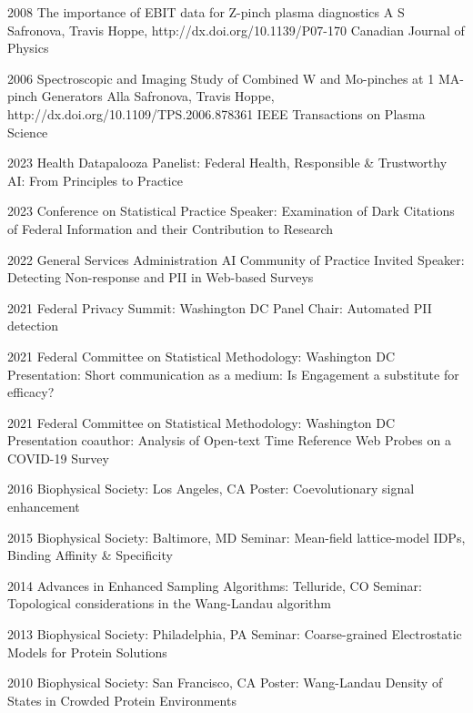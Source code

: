 \documentclass[]{scrartcl}
\begin{document}
\begin{cleanCV}
\Paper
{2008}
{The importance of EBIT data for Z-pinch plasma diagnostics}
{A S Safronova, Travis Hoppe, \etal}
{http://dx.doi.org/10.1139/P07-170}
{Canadian Journal of Physics}

\Paper
{2006}
{Spectroscopic and Imaging Study of Combined W and Mo-pinches 
  at 1 MA-pinch Generators}
{Alla Safronova, Travis Hoppe, \etal}
{http://dx.doi.org/10.1109/TPS.2006.878361}
{IEEE Transactions on Plasma Science}





\WorkExperienceX
{2023}
{Health Datapalooza}
{Panelist: Federal Health, Responsible \& Trustworthy AI: From Principles to Practice}

\WorkExperienceX
{2023}
{Conference on Statistical Practice}
{Speaker: Examination of Dark Citations of Federal Information and their Contribution to Research}

\WorkExperienceX
{2022}
{General Services Administration AI Community of Practice}
{Invited Speaker: Detecting Non-response and PII in Web-based Surveys}

\WorkExperienceX
{2021}
{Federal Privacy Summit: Washington DC}
{Panel Chair: Automated PII detection}

\WorkExperienceX
{2021}
{Federal Committee on Statistical Methodology: Washington DC}
{Presentation: Short communication as a medium: Is Engagement a substitute for efficacy?}

\WorkExperienceX
{2021}
{Federal Committee on Statistical Methodology: Washington DC}
{Presentation coauthor: Analysis of Open-text Time Reference Web Probes on a COVID-19 Survey}

\WorkExperienceX
{2016}
{Biophysical Society: Los Angeles, CA}
{Poster: Coevolutionary signal enhancement}


\WorkExperienceX
{2015}
{Biophysical Society: Baltimore, MD}
{Seminar: Mean-field lattice-model IDPs, Binding Affinity \& Specificity}

\WorkExperienceX
{2014}
{Advances in Enhanced Sampling Algorithms: Telluride, CO}
{Seminar: Topological considerations in the Wang-Landau algorithm}

\WorkExperienceX
{2013}
{Biophysical Society: Philadelphia, PA}
{Seminar: Coarse-grained Electrostatic Models for Protein Solutions}

\WorkExperienceX
{2010}
{Biophysical Society: San Francisco, CA}
{Poster: Wang-Landau Density of States in Crowded Protein Environments}


\end{cleanCV}
\end{document}
